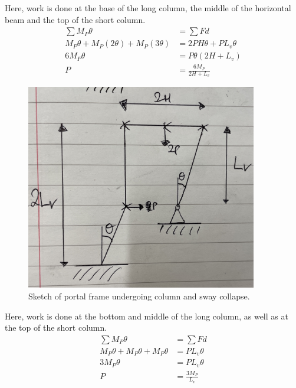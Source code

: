 \documentclass[11pt]{article}
\numberwithin{equation}{section}
\begin{document}
Here, work is done at the base of the long column, the middle of the horizontal beam and the top of the short column. 
\begin{align}
    \sum M_P \theta &= \sum Fd\\
    M_P \theta + M_P (2\theta) + M_P (3\theta) &= 2PH\theta + PL_v\theta\\
    6M_P\theta &= P\theta \left(2H + L_v\right)\\
    P &= \frac{6M_P}{2H + L_v}
\end{align}
\begin{figure}[H]
    \centering
    \includegraphics[width = 0.9\textwidth]{./img/q3i7.jpg}
    \caption{Sketch of portal frame undergoing column and sway collapse.}
\end{figure}
Here, work is done at the bottom and middle of the long column, as well as at the top of the short column.
\begin{align}
    \sum M_P\theta &= \sum Fd\\
    M_P\theta + M_P\theta + M_P\theta &= PL_v\theta\\
    3M_P\theta &= PL_v\theta\\
    P &= \frac{3M_P}{L_v}
\end{align}
\end{document}
